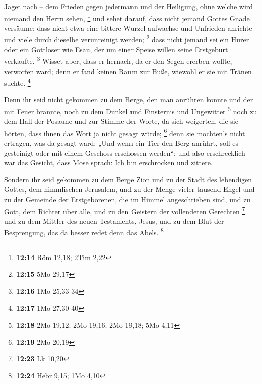  Jaget nach -- dem Frieden gegen jedermann und der
Heiligung, ohne welche wird niemand den Herrn sehen, \footnote{\textbf{12:14}
  Röm 12,18; 2Tim 2,22}  und sehet darauf, dass nicht
jemand Gottes Gnade versäume; dass nicht etwa eine bittere Wurzel
aufwachse und Unfrieden anrichte und viele durch dieselbe verunreinigt
werden; \footnote{\textbf{12:15} 5Mo 29,17}  dass nicht
jemand sei ein Hurer oder ein Gottloser wie Esau, der um einer Speise
willen seine Erstgeburt verkaufte. \footnote{\textbf{12:16} 1Mo 25,33-34}
 Wisset aber, dass er hernach, da er den Segen ererben
wollte, verworfen ward; denn er fand keinen Raum zur Buße, wiewohl er
sie mit Tränen suchte. \footnote{\textbf{12:17} 1Mo 27,30-40}

 Denn ihr seid nicht gekommen zu dem Berge, den man
anrühren konnte und der mit Feuer brannte, noch zu dem Dunkel und
Finsternis und Ungewitter \footnote{\textbf{12:18} 2Mo 19,12; 2Mo 19,16;
  2Mo 19,18; 5Mo 4,11}  noch zu dem Hall der Posaune und
zur Stimme der Worte, da sich weigerten, die sie hörten, dass ihnen das
Wort ja nicht gesagt würde; \footnote{\textbf{12:19} 2Mo 20,19}
 denn sie mochten's nicht ertragen, was da gesagt ward:
„Und wenn ein Tier den Berg anrührt, soll es gesteinigt oder mit einem
Geschoss erschossen werden``;  und also erschrecklich war
das Gesicht, dass Mose sprach: Ich bin erschrocken und zittere.

 Sondern ihr seid gekommen zu dem Berge Zion und zu der
Stadt des lebendigen Gottes, dem himmlischen Jerusalem, und zu der Menge
vieler tausend Engel  und zu der Gemeinde der
Erstgeborenen, die im Himmel angeschrieben sind, und zu Gott, dem
Richter über alle, und zu den Geistern der vollendeten Gerechten
\footnote{\textbf{12:23} Lk 10,20}  und zu dem Mittler des
neuen Testaments, Jesus, und zu dem Blut der Besprengung, das da besser
redet denn das Abels. \footnote{\textbf{12:24} Hebr 9,15; 1Mo 4,10}

